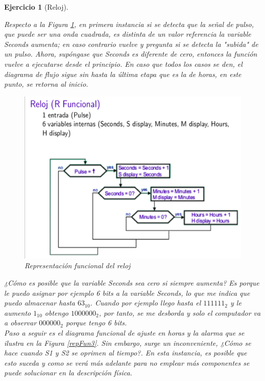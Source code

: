 \documentclass[12pt,letterpaper]{book}
\newtheorem{exercise}{Ejercicio}
\begin{document}
\begin{exercise}[Reloj]
\begin{multicols}{2}
Respecto a la Figura \ref{repFun2}, en primera instancia si se detecta que la señal de pulso, que puede ser una onda cuadrada, es distinta de un valor referencia la variable Seconds aumenta; en caso contrario vuelve y pregunta si se detecta la "subida" de un pulso. Ahora, supóngase que Seconds es diferente de cero, entonces la función vuelve a ejecutarse desde el principio. En caso que todos los casos se den, el diagrama de flujo sigue sin hasta la última etapa que es la de horas, en este punto, se retorna al inicio.  

\begin{figure}[H]
\centering
\includegraphics[width=1\linewidth]{figures/repFun2.png}
\caption{Representación funcional del reloj}
\label{repFun2}
\end{figure}
\vspace{0.2cm}

¿Cómo es posible que la variable Seconds sea cero si siempre aumenta? Es porque le puedo asignar por ejemplo 6 bits a la variable Seconds, lo que me indica que puedo almacenar hasta $63_{10}$. Cuando por ejemplo llego hasta el $111111_{2}$ y le aumento $1_{10}$ obtengo $1000000_2$, por tanto, se me desborda y solo el computador va a observar $000000_2$ porque tengo 6 bits.\\

Paso a seguir es el diagrama funcional de ajuste en horas y la alarma que se ilustra en la Figura \ref{repFun3}. Sin embargo, surge un inconveniente, ¿Cómo se hace cuando S1 y S2 se oprimen al tiempo?. En esta instancia, es posible que esto suceda y como se verá más adelante para no emplear más componentes se puede solucionar en la descripción física. 


\end{multicols}
\end{exercise}
\end{document}

